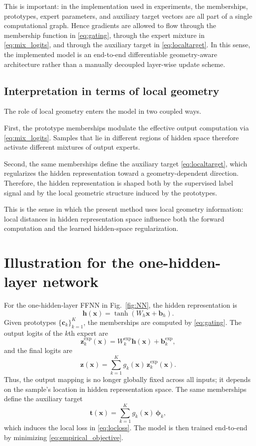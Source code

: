 \documentclass{article}
\theoremstyle{definition}
\theoremstyle{remark}
\begin{document}
This is important: in the implementation used in experiments, the memberships, prototypes, expert parameters, and auxiliary target vectors are all part of a single computational graph. Hence gradients are allowed to flow through the membership function in \eqref{eq:gating}, through the expert mixture in \eqref{eq:mix_logits}, and through the auxiliary target in \eqref{eq:localtarget}. In this sense, the implemented model is an end-to-end differentiable geometry-aware architecture rather than a manually decoupled layer-wise update scheme.

\subsection{Interpretation in terms of local geometry}

The role of local geometry enters the model in two coupled ways.

First, the prototype memberships modulate the effective output computation via \eqref{eq:mix_logits}. Samples that lie in different regions of hidden space therefore activate different mixtures of output experts.

Second, the same memberships define the auxiliary target \eqref{eq:localtarget}, which regularizes the hidden representation toward a geometry-dependent direction. Therefore, the hidden representation is shaped both by the supervised label signal and by the local geometric structure induced by the prototypes.

This is the sense in which the present method uses local geometry information: local distances in hidden representation space influence both the forward computation and the learned hidden-space regularization.

\section{Illustration for the one-hidden-layer network}

For the one-hidden-layer FFNN in Fig.~\ref{fig:NN}, the hidden representation is
\[
\mathbf{h}(\mathbf{x})=\tanh(W_h\mathbf{x}+\mathbf{b}_h).
\]
Given prototypes $\{\mathbf{c}_k\}_{k=1}^{K}$, the memberships are computed by \eqref{eq:gating}. The output logits of the $k$th expert are
\[
\mathbf{z}_k^{\mathrm{exp}}(\mathbf{x})=W_k^{\mathrm{exp}}\mathbf{h}(\mathbf{x})+\mathbf{b}_k^{\mathrm{exp}},
\]
and the final logits are
\[
\mathbf{z}(\mathbf{x})=\sum_{k=1}^{K}g_k(\mathbf{x})\,\mathbf{z}_k^{\mathrm{exp}}(\mathbf{x}).
\]
Thus, the output mapping is no longer globally fixed across all inputs; it depends on the sample's location in hidden representation space. The same memberships define the auxiliary target
\[
\mathbf{t}(\mathbf{x})=\sum_{k=1}^{K}g_k(\mathbf{x})\,\boldsymbol{\phi}_k,
\]
which induces the local loss in \eqref{eq:locloss}. The model is then trained end-to-end by minimizing \eqref{eq:empirical_objective}.
\end{document}
